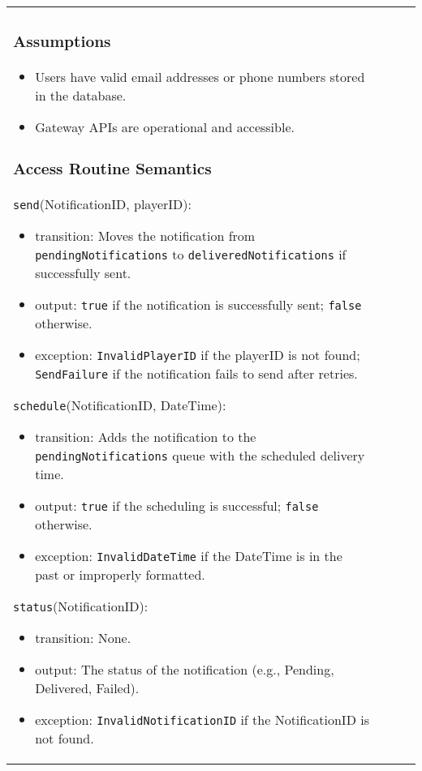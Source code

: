\documentclass[12pt, titlepage]{article}
\begin{document}
\begin{itemize}
\begin{center}
\begin{tabular}{|p{3cm}|p{4cm}|p{4cm}|p{4cm}|}
\begin{itemize}
\subsubsection{Assumptions}

\begin{itemize}
    \item Users have valid email addresses or phone numbers stored in the database.
    \item Gateway APIs are operational and accessible.
\end{itemize}

\subsubsection{Access Routine Semantics}

\noindent \texttt{send}(NotificationID, playerID):
\begin{itemize}
    \item transition: Moves the notification from \texttt{pendingNotifications} to \texttt{deliveredNotifications} if successfully sent.
    \item output: \texttt{true} if the notification is successfully sent; \texttt{false} otherwise.
    \item exception: \texttt{InvalidPlayerID} if the playerID is not found; \texttt{SendFailure} if the notification fails to send after retries.
\end{itemize}

\noindent \texttt{schedule}(NotificationID, DateTime):
\begin{itemize}
    \item transition: Adds the notification to the \texttt{pendingNotifications} queue with the scheduled delivery time.
    \item output: \texttt{true} if the scheduling is successful; \texttt{false} otherwise.
    \item exception: \texttt{InvalidDateTime} if the DateTime is in the past or improperly formatted.
\end{itemize}

\noindent \texttt{status}(NotificationID):
\begin{itemize}
    \item transition: None.
    \item output: The status of the notification (e.g., Pending, Delivered, Failed).
    \item exception: \texttt{InvalidNotificationID} if the NotificationID is not found.
\end{itemize}


\end{itemize}
\end{tabular}
\end{center}
\end{itemize}
\end{document}
